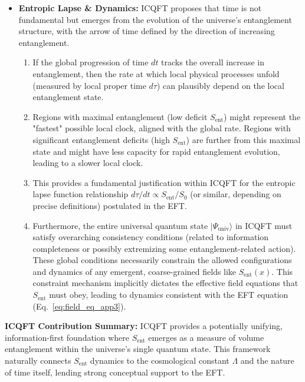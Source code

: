 \documentclass[11pt]{article}
\begin{document}
\begin{itemize}
    \item \textbf{Entropic Lapse \& Dynamics:} ICQFT proposes that time is not fundamental but emerges from the evolution of the universe's entanglement structure, with the arrow of time defined by the direction of increasing entanglement.
        \begin{enumerate}
            \item If the global progression of time $dt$ tracks the overall increase in entanglement, then the rate at which local physical processes unfold (measured by local proper time $d\tau$) can plausibly depend on the local entanglement state.
            \item Regions with maximal entanglement (low deficit $S_{\mathrm{ent}}$) might represent the "fastest" possible local clock, aligned with the global rate. Regions with significant entanglement deficits (high $S_{\mathrm{ent}}$) are further from this maximal state and might have less capacity for rapid entanglement evolution, leading to a slower local clock.
            \item This provides a fundamental justification within ICQFT for the entropic lapse function relationship $d\tau/dt \propto S_{\mathrm{ent}}/S_0$ (or similar, depending on precise definitions) postulated in the EFT.
            \item Furthermore, the entire universal quantum state $|\Psi_{\mathrm{univ}}\rangle$ in ICQFT must satisfy overarching consistency conditions (related to information completeness or possibly extremizing some entanglement-related action). These global conditions necessarily constrain the allowed configurations and dynamics of any emergent, coarse-grained fields like $S_{\mathrm{ent}}(x)$. This constraint mechanism implicitly dictates the effective field equations that $S_{\mathrm{ent}}$ must obey, leading to dynamics consistent with the EFT equation (Eq.~\eqref{eq:field_eq_app3}).
        \end{enumerate}
\end{itemize}

\textbf{ICQFT Contribution Summary:} ICQFT provides a potentially unifying, information-first foundation where $S_{\mathrm{ent}}$ emerges as a measure of volume entanglement within the universe's single quantum state. This framework naturally connects $S_{\mathrm{ent}}$ dynamics to the cosmological constant $\Lambda$ and the nature of time itself, lending strong conceptual support to the EFT.

\end{document}
